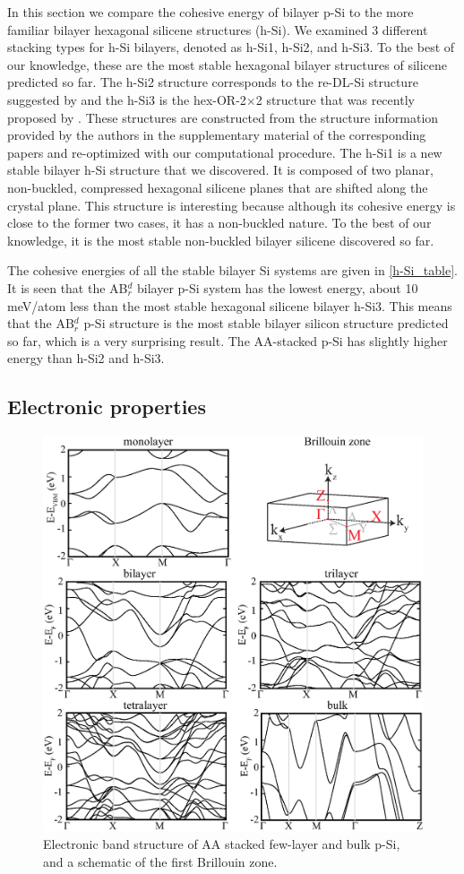 In this section we compare the cohesive energy of bilayer p-Si to the more familiar bilayer hexagonal silicene structures (h-Si).  We examined 3 different stacking types for h-Si bilayers, denoted as h-Si1, h-Si2, and h-Si3. To the best of our knowledge, these are the most stable hexagonal bilayer structures of silicene predicted so far. The h-Si2 structure corresponds to the re-DL-Si structure suggested by \citet{Morishita2011} and the h-Si3 is the hex-OR-2$\times$2 structure that was recently proposed by \citet{Sakai2015}. These structures are constructed from the structure information provided by the authors in the supplementary material of the corresponding papers and re-optimized with our computational procedure. The h-Si1 is a new stable bilayer h-Si structure that we discovered. It is composed of two planar, non-buckled, compressed hexagonal silicene planes that are shifted along the crystal plane. This structure is interesting because although its cohesive energy is close to the former two cases, it has a non-buckled nature. To the best of our knowledge, it is the most stable non-buckled bilayer silicene discovered so far. 

The cohesive energies of all the stable bilayer Si systems are given in \autoref{h-Si_table}. It is seen that the AB$_r^d$ bilayer p-Si system has the lowest energy, about 10 meV/atom less than the most stable hexagonal silicene bilayer h-Si3.  This means that the AB$_r^d$ p-Si structure is the most stable bilayer silicon structure predicted so far, which is a very surprising result. The AA-stacked p-Si has slightly higher energy than h-Si2 and h-Si3.

\subsection{Electronic properties}\label{elec}

\begin{figure}[htbp]
\centering
\includegraphics[width=0.8\linewidth]{ps_AA_bands.eps}%
\caption{Electronic band structure of AA stacked few-layer and bulk p-Si, and a schematic of the first Brillouin zone. \label{fig:AA_bands}}
\end{figure}

